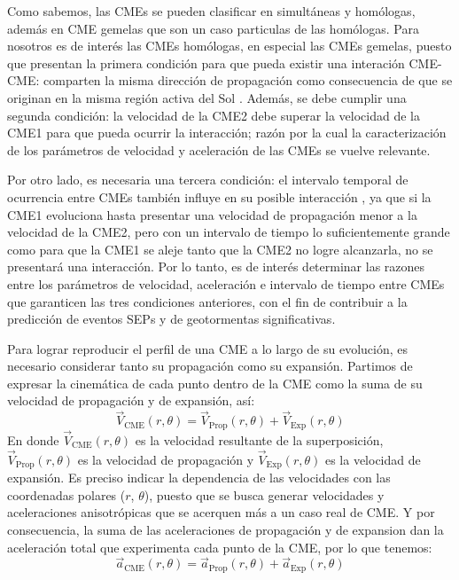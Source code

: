 Como sabemos, las CMEs se pueden clasificar en simultáneas y homólogas, además en CME gemelas que son un caso particulas de las homólogas. Para nosotros es de interés las CMEs homólogas, en especial las CMEs gemelas, puesto que presentan la primera condición para que pueda existir una interación CME-CME: comparten la misma dirección de propagación como consecuencia de que se originan en la misma región activa del Sol \parencite[e.g.,][]{li-2012}. Además, se debe cumplir una segunda condición: la velocidad de la CME2 debe superar la velocidad de la CME1 para que pueda ocurrir la interacción; razón por la cual la caracterización de los parámetros de velocidad y aceleración de las CMEs se vuelve relevante. 

Por otro lado, es necesaria una tercera condición: el intervalo temporal de ocurrencia entre CMEs también influye en su posible interacción  \parencite[e.g.,][]{temmer-2012}, ya que si la CME1 evoluciona hasta presentar una velocidad de propagación menor a la velocidad de la CME2, pero con un intervalo de tiempo lo suficientemente grande como para que la CME1 se aleje tanto que la CME2 no logre alcanzarla, no se presentará una interacción. Por lo tanto, es de interés determinar las razones entre los parámetros de velocidad, aceleración e intervalo de tiempo entre CMEs que garanticen las tres condiciones anteriores, con el fin de contribuir a la predicción de eventos SEPs y de geotormentas significativas. 

Para lograr reproducir el perfil de una CME a lo largo de su evolución, es necesario considerar tanto su propagación como su expansión. Partimos de expresar la cinemática de cada punto dentro de la CME como la suma de su velocidad de propagación y de expansión, así:
\begin{equation}
\vec{V}_{\text{CME}}(r,\theta)=\vec{V}_{\text{Prop}}(r,\theta)+\vec{V}_{\text{Exp}}(r,\theta)
\end{equation}
En donde $\vec{V}_{\text{CME}}(r,\theta)$ es la velocidad resultante de la superposición, $\vec{V}_{\text{Prop}}(r,\theta)$ es la velocidad de propagación y $\vec{V}_{\text{Exp}}(r,\theta)$ es la velocidad de expansión. Es preciso indicar la dependencia de las velocidades con las coordenadas polares ($r$, $\theta$), puesto que se busca generar velocidades y aceleraciones anisotrópicas que se acerquen más a un caso real de CME.
Y por consecuencia, la suma de las aceleraciones de propagación y de expansion dan la aceleración total que experimenta cada punto de la CME, por lo que tenemos:
\begin{equation}
\vec{a}_{\text{CME}}(r,\theta)=\vec{a}_{\text{Prop}}(r,\theta)+\vec{a}_{\text{Exp}}(r,\theta)
\end{equation}
 

